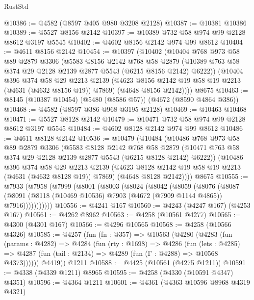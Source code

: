 \begin{lexlean}{RustStd}
\begin{coremodule}
@10386 := @4582 (@8597 @405 @980 @3208 @2128)
@10387 := @10381 @10386
@10389 := @5527 @8156 @2142
@10397 := @10389 @732 @58 @974 @99 @2128 @8612 @3197 @5545
@10402 := @4602 @8156 @2142 @974 @99 @8612
@10404 := @4611 @8156 @2142
@10454 := @10397
    (@10402
      (@10404
        @768
        @973
        @58
        @89
        @2879
        @3306
        (@5583
          @8156
          @2142
          @768
          @58
          @2879
          (@10389 @763 @58 @374 @29 @2128 @2139 @2877 @5543 (@6215 @8156 @2142) @6222))
        (@10404
          @396
          @374
          @58
          @29
          @2213
          @2139
          (@4623 @8156 @2142 @19 @58 @19 @2213 (@4631 (@4632 @8156 @19)) @7869)
          (@4648 @8156 @2142))))
    @8675
@10463 := @8145 (@10387 @10454) (@5480 (@8586 @57)) (@4672 (@8590 @4864 @386))
@10468 := @4582 (@8597 @386 @968 @3195 @2128)
@10469 := @10463 @10468
@10471 := @5527 @8128 @2142
@10479 := @10471 @732 @58 @974 @99 @2128 @8612 @3197 @5545
@10484 := @4602 @8128 @2142 @974 @99 @8612
@10486 := @4611 @8128 @2142
@10536 := @10479
    (@10484
      (@10486
        @768
        @973
        @58
        @89
        @2879
        @3306
        (@5583
          @8128
          @2142
          @768
          @58
          @2879
          (@10471 @763 @58 @374 @29 @2128 @2139 @2877 @5543 (@6215 @8128 @2142) @6222))
        (@10486
          @396
          @374
          @58
          @29
          @2213
          @2139
          (@4623 @8128 @2142 @19 @58 @19 @2213 (@4631 (@4632 @8128 @19)) @7869)
          (@4648 @8128 @2142))))
    @8675
@10555 := @7933
    (@7958
      (@7999
        (@8001
          (@8003
            (@8024
              (@8042
                (@8059
                  (@8076
                    (@8087
                      (@8091
                        (@8118 (@10469 @10536) @7903 (@4672 (@7909 @1144 @4865)) @7916)))))))))))
@10556 := @4241 @167
@10560 := @4243 (@4247 @167) (@4253 @167)
@10561 := @4262 @8962
@10563 := @4258 (@10561 @4277)
@10565 := @4300 (@4301 @167)
@10566 := @4296 @10565
@10568 := @4258 (@10566 @4326)
@10585 := @4257
    (fun (fn : @357) =>
    @10563
      (@4280
        (@4283
          (fun (params : @4282) =>
          @4284
            (fun (rty : @1698) =>
            @4286
              (fun (lets : @4285) =>
              @4287 (fun (tail : @2134) => @4289 (fun (Γ : @4288) => @10568 @4373))))))
        @4419))
    @1211
@10588 := @4425 (@10561 (@4275 @1211))
@10591 := @4338 (@4339 @1211) @8965
@10595 := @4258 (@4330 (@10591 @4347) @4351)
@10596 := @4364 @1211
@10601 := @4361 (@4363 @10596 @8968 @4319 @4321)

\end{coremodule}
\end{lexlean}
